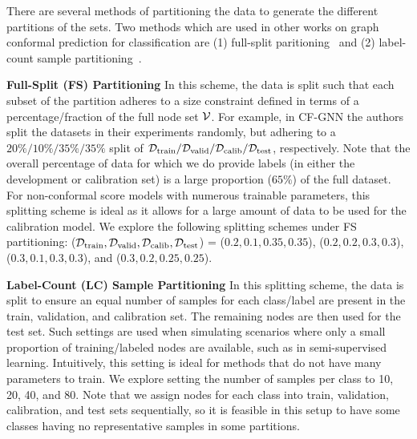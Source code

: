 There are several methods of partitioning the data to generate the different partitions of the sets. 
Two methods which are used in other works on graph conformal prediction for classification are (1) full-split paritioning~\cite{huang2024uncertainty} and (2) label-count sample partitioning~\cite{zargarbashi23conformal}.
 
\noindent \textbf{Full-Split (FS) Partitioning}
In this scheme, the data is split such that each subset of the partition adheres to a size constraint defined in terms of a percentage/fraction of the full node set ${\mathcal{V}}$.
For example, in CF-GNN \cite{huang2024uncertainty} the authors split the datasets in their experiments randomly, but adhering to a $20\%/10\%/35\%/35\%$ split of $\mathcal{D_{\mathrm{train}}}/\mathcal{D_{\mathrm{valid}}}/\mathcal{D_{\mathrm{calib}}}/\mathcal{D_{\mathrm{test}}}$, respectively.
Note that the overall percentage of data for which we do provide labels (in either the development or calibration set) is a large proportion ($65\%$) of the full dataset.
For non-conformal score models with numerous trainable parameters, this splitting scheme is ideal as it allows for a large amount of data to be used for the calibration model.
We explore the following splitting schemes under FS partitioning:
($\mathcal{D_{\mathrm{train}}},\mathcal{D_{\mathrm{valid}}},\mathcal{D_{\mathrm{calib}}},\mathcal{D_{\mathrm{test}}}$) = ($0.2, 0.1,0.35, 0.35$), ($0.2,0.2,0.3,0.3$), ($0.3,0.1,0.3,0.3$), and ($0.3,0.2,0.25,0.25$).

\noindent \textbf{Label-Count (LC) Sample Partitioning}
In this splitting scheme, the data is split to ensure an equal number of samples for each class/label are present in the train, validation, and calibration set.
The remaining nodes are then used for the test set.
Such settings are used when simulating scenarios where only a small proportion of training/labeled nodes are available, such as in semi-supervised learning.
Intuitively, this setting is ideal for methods that do not have many parameters to train.
We explore setting the number of samples per class to 10, 20, 40, and 80.
Note that we assign nodes for each class into train, validation, calibration, and test sets sequentially, so it is feasible in this setup to have some classes having no representative samples in some partitions. 